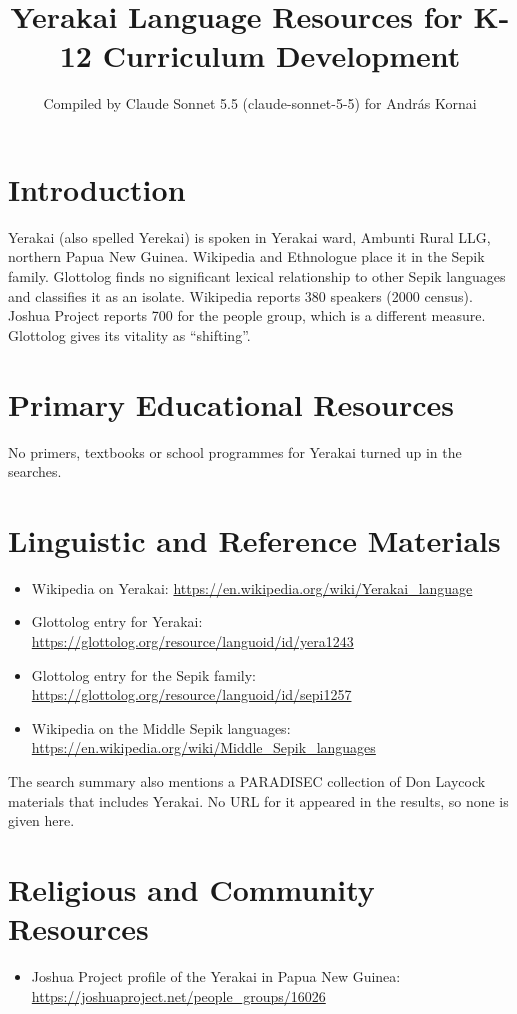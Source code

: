\documentclass[12pt]{article}
\title{Yerakai Language Resources for K-12 Curriculum Development}
\author{Compiled by Claude Sonnet 5.5 (claude-sonnet-5-5) for Andr\'as Kornai}
\date{}
\begin{document}
\maketitle

\section{Introduction}
Yerakai (also spelled Yerekai) is spoken in Yerakai ward, Ambunti Rural LLG, northern Papua New Guinea. Wikipedia and Ethnologue place it in the Sepik family. Glottolog finds no significant lexical relationship to other Sepik languages and classifies it as an isolate. Wikipedia reports 380 speakers (2000 census). Joshua Project reports 700 for the people group, which is a different measure. Glottolog gives its vitality as ``shifting''.

\section{Primary Educational Resources}
No primers, textbooks or school programmes for Yerakai turned up in the searches.

\section{Linguistic and Reference Materials}
\begin{itemize}
\item Wikipedia on Yerakai: \url{https://en.wikipedia.org/wiki/Yerakai_language}
\item Glottolog entry for Yerakai: \url{https://glottolog.org/resource/languoid/id/yera1243}
\item Glottolog entry for the Sepik family: \url{https://glottolog.org/resource/languoid/id/sepi1257}
\item Wikipedia on the Middle Sepik languages: \url{https://en.wikipedia.org/wiki/Middle_Sepik_languages}
\end{itemize}
The search summary also mentions a PARADISEC collection of Don Laycock materials that includes Yerakai. No URL for it appeared in the results, so none is given here.

\section{Religious and Community Resources}
\begin{itemize}
\item Joshua Project profile of the Yerakai in Papua New Guinea: \url{https://joshuaproject.net/people_groups/16026}
\end{itemize}
\end{document}
